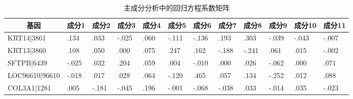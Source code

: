\begin{table}[h]
\centering
\caption{主成分分析中的回归方程系数矩阵}
\begin{tabular}{llllllllllll}
\hline
\multicolumn{1}{c}{\textbf{基因}} & \multicolumn{1}{c}{\textbf{成分1}} & \multicolumn{1}{c}{\textbf{成分2}} & \multicolumn{1}{c}{\textbf{成分3}} & \multicolumn{1}{c}{\textbf{成分4}} & \multicolumn{1}{c}{\textbf{成分5}} & \multicolumn{1}{c}{\textbf{成分6}} & \multicolumn{1}{c}{\textbf{成分7}} & \multicolumn{1}{c}{\textbf{成分8}} & \multicolumn{1}{c}{\textbf{成分9}} & \multicolumn{1}{c}{\textbf{成分10}} & \multicolumn{1}{c}{\textbf{成分11}} \\ \hline
KRT14|3861                      & .134                             & .033                             & -.025                            & .060                             & -.111                            & -.136                            & .193                             & .303                             & -.039                            & -.043                             & -.007                             \\
KRT13|3860                      & .108                             & .050                             & .000                             & .075                             & .247                             & .162                             & -.188                            & -.241                            & .061                             & .015                              & -.002                             \\
SFTPB|6439                      & -.025                            & .032                             & .204                             & .059                             & .004                             & -.010                            & .000                             & .026                             & -.062                            & .000                              & .071                              \\
LOC96610|96610                  & -.018                            & .017                             & .028                             & .064                             & -.120                            & .465                             & .057                             & .134                             & -.252                            & .012                              & .088                              \\
COL3A1|1281                     & .005                             & -.181                            & -.045                            & .196                             & -.001                            & -.068                            & -.038                            & .033                             & -.014                            & .035                              & -.023                             \\

\end{tabular}
\end{table}
